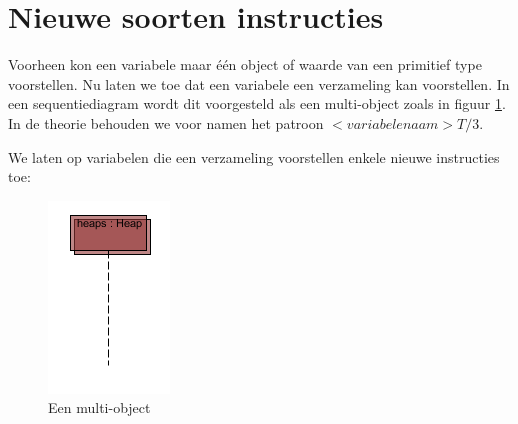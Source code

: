 \section{Nieuwe soorten instructies}

Voorheen kon een variabele maar \'e\'en object of waarde van een primitief type voorstellen. Nu laten we toe dat een variabele een verzameling kan voorstellen. In een sequentiediagram wordt dit voorgesteld als een multi-object zoals in figuur \ref{fig:multi-object}. In de theorie behouden we voor namen het patroon $<variabelenaam>T/3$.

We laten op variabelen die een verzameling voorstellen enkele nieuwe instructies toe:

\begin{figure}
	\includegraphics{chap-gedrag/seq-multi-object.png}
	\centering
	\caption{Een multi-object}
	\label{fig:multi-object}
\end{figure}


